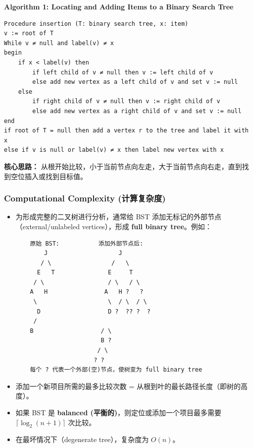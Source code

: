 \documentclass[10pt,a4paper,openany]{ctexbook}
\theoremstyle{definition}
\theoremstyle{remark}
\begin{document}
\textbf{Algorithm 1: Locating and Adding Items to a Binary Search Tree}
{\footnotesize\begin{verbatim}
Procedure insertion (T: binary search tree, x: item)
v := root of T
While v ≠ null and label(v) ≠ x
begin
    if x < label(v) then
        if left child of v ≠ null then v := left child of v
        else add new vertex as a left child of v and set v := null
    else
        if right child of v ≠ null then v := right child of v
        else add new vertex as a right child of v and set v := null
end
if root of T = null then add a vertex r to the tree and label it with x
else if v is null or label(v) ≠ x then label new vertex with x
\end{verbatim}}

\textbf{核心思路：} 从根开始比较，小于当前节点向左走，大于当前节点向右走，直到找到空位插入或找到目标值。
\subsubsection{Computational Complexity (计算复杂度)}

\begin{itemize}
\item 为形成完整的二叉树进行分析，通常给 BST 添加无标记的外部节点（external/unlabeled vertices），形成 \textbf{full binary tree}。例如：

{\footnotesize\begin{verbatim}
    原始 BST:           添加外部节点后:
        J                    J
       / \                 /   \
      E   T               E     T
     / \                  / \   / \
    A   H                A   H ?   ?
     \                    \  / \  / \
      D                   D ?  ?? ?  ?
     /
    B                   / \
                        B ?
                       / \
                      ? ?
    每个 ? 代表一个外部(空)节点，使树变为 full binary tree
\end{verbatim}}


\item 添加一个新项目所需的最多比较次数 = 从根到叶的最长路径长度（即树的高度）。
\item 如果 BST 是 \textbf{balanced (平衡的)}，则定位或添加一个项目最多需要 \textbf{$\lceil \log_2 (n+1) \rceil$} 次比较。
\item 在最坏情况下（degenerate tree），复杂度为 $O(n)$。

\end{itemize}

\vspace{-2pt}
\end{document}
